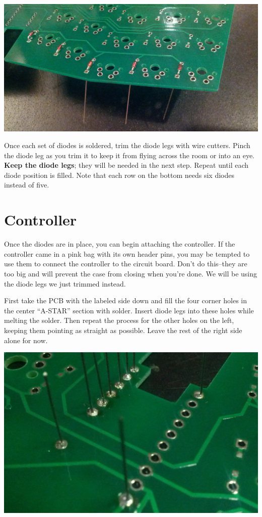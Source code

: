 \documentclass[landscape,twocolumn]{article}
\begin{document}
\vspace{1em}
\includegraphics[width=\columnwidth]{diodes.jpg}
\vspace{1em}

Once each set of diodes is soldered, trim the diode legs with wire
cutters. Pinch the diode leg as you trim it to keep it from flying
across the room or into an eye. \textbf{Keep the diode legs}; they will be
needed in the next step. Repeat until each diode position is
filled. Note that each row on the bottom needs six diodes instead of five.

\section{Controller}

Once the diodes are in place, you can begin attaching the controller.
If the controller came in a pink bag with its own header pins, you may
be tempted to use them to connect the controller to the circuit
board. Don't do this--they are too big and will prevent the case from
closing when you're done. We will be using the diode legs we just
trimmed instead.

\vspace{1em}

First take the PCB with the labeled side down and fill the four corner
holes in the center ``A-STAR'' section with solder. Insert diode legs
into these holes while melting the solder. Then repeat the process for
the other holes on the left, keeping them pointing as straight as
possible. Leave the rest of the right side alone for now.

\vspace{1em}
\begin{center}\includegraphics[width=0.8\columnwidth]{many-pins.jpg}\end{center}
\vspace{1em}
\end{document}
